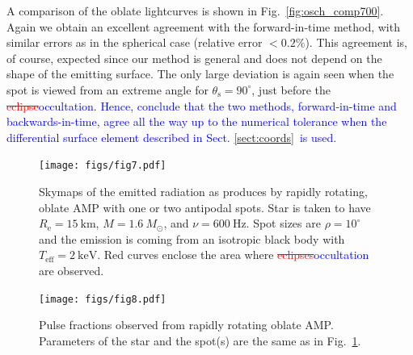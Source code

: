 \documentclass{aa}
\newcommand{\refe}[1]{\textcolor{blue}{{#1}}}
\newcommand{\refedel}[1]{\textcolor{red}{\sout{#1}}}
\newcommand{\Msun}{\ensuremath{M_{\odot}}}
\begin{document}
A comparison of the oblate lightcurves is shown in Fig.~\ref{fig:osch_comp700}.
Again we obtain an excellent agreement with the forward-in-time method, with similar errors as in the spherical case (relative error $< 0.2\%$).
This agreement is, of course, expected since our method is general and does not depend on the shape of the emitting surface.
The only large deviation is again seen when the spot is viewed from an extreme angle for $\theta_{\mathrm{s}} = 90^{\circ}$, just before the \refedel{eclipse}\refe{occultation}.
\refe{Hence, conclude that the two methods, forward-in-time and backwards-in-time, agree all the way up to the numerical tolerance when the differential surface element described in Sect. \ref{sect:coords} is used.}



\begin{figure}
\texttt{[image: figs/fig7.pdf]}
\caption{\label{fig:skymap}
    Skymaps of the emitted radiation as produces by rapidly rotating, oblate AMP with one or two antipodal spots.
    Star is taken to have $R_{\mathrm{e}} = 15~\mathrm{km}$, $M=1.6~\Msun$, and $\nu = 600~\mathrm{Hz}$.
    Spot sizes are $\rho = 10^{\circ}$ and the emission is coming from an isotropic black body with $T_{\mathrm{eff}} = 2~\mathrm{keV}$.
    Red curves enclose the area where \refedel{eclipses}\refe{occultation} are observed.
  }
\end{figure}

\begin{figure}
\texttt{[image: figs/fig8.pdf]}
\caption{\label{fig:pulsefracs}
    Pulse fractions observed from rapidly rotating oblate AMP.
    Parameters of the star and the spot(s) are the same as in Fig.~\ref{fig:skymap}.
  }
\end{figure}
\end{document}
